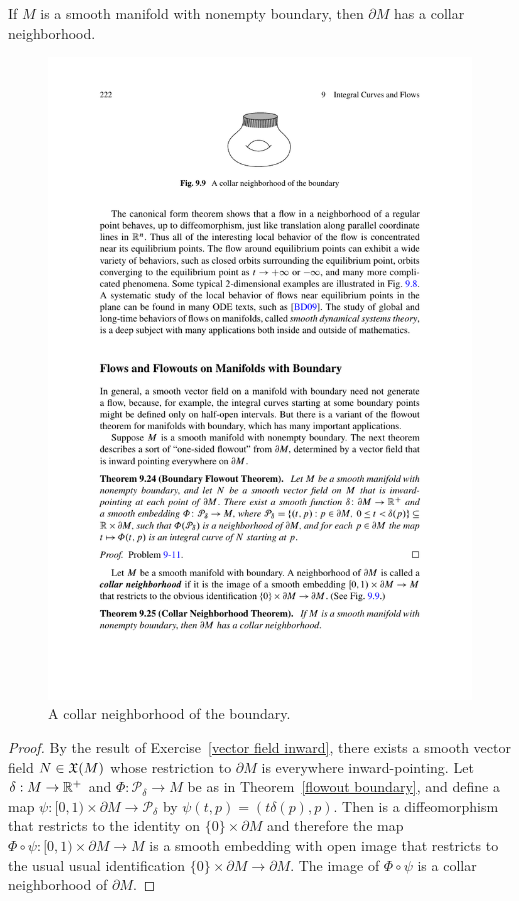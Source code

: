 \begin{theorem}\label{collar nbhd}
If $M$ is a smooth manifold with nonempty boundary, then $\partial M$ has a collar neighborhood.
\end{theorem}
\begin{figure}[htbp]
\centering
\includegraphics{pictures/collar}
\caption{A collar neighborhood of the boundary.}
\end{figure}
\begin{proof}
By the result of Exercise~\ref{vector field inward}, there exists a smooth vector field $N\in\mathfrak{X}(M)$ whose restriction to $\partial M$ is everywhere inward-pointing. Let $\delta:M\to\mathbb{R}^+$ and $\varPhi:\mathcal{P}_\delta\to M$ be as in Theorem~\ref{flowout boundary}, and define a map $\psi:[0,1)\times\partial M\to\mathcal{P}_\delta$ by $\psi(t,p)=(t\delta(p),p)$. Then is a diffeomorphism that restricts to the identity on $\{0\}\times\partial M$ and therefore the map $\varPhi\circ\psi:[0,1)\times\partial M\to M$ is a smooth embedding with open image that restricts to the usual usual identification $\{0\}\times\partial M\to \partial M$. The image of $\varPhi\circ\psi$ is a collar neighborhood of $\partial M$.
\end{proof}
